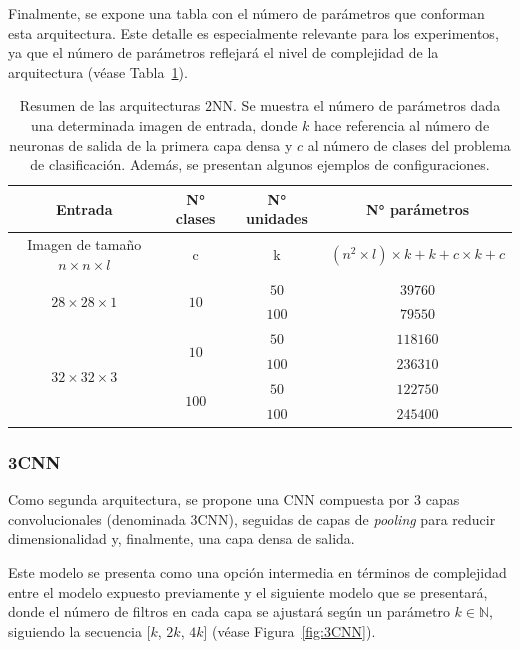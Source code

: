 Finalmente, se expone una tabla con el número de parámetros que conforman esta arquitectura. Este detalle es especialmente relevante para los experimentos, ya que el número de parámetros reflejará el nivel de complejidad de la arquitectura (véase Tabla~\ref{tab:numero-parametros}).

\begin{table}[ht]
    \centering
    \renewcommand{\arraystretch}{1.5} 
    \begin{tabular}{|c|c|c|c|}
    \hline
    \textbf{Entrada} & \textbf{N° clases} & \textbf{N° unidades} & \textbf{N° parámetros} \\ \hline
    Imagen de tamaño $n \times n \times l$ & c & k & $(n^2 \times l) \times k + k + c \times k + c$ \\ \hline
    \multirow{2}{*}{$28 \times 28 \times 1$} & \multirow{2}{*}{$10$} & $50$ & $39 760$ \\ \cline{3-4}
    & & $100$ & $79 550$ \\ \hline
    \multirow{4}{*}{$32 \times 32 \times 3$} & \multirow{2}{*}{$10$} & $50$ & $118 160$ \\ \cline{3-4}
    & & $100$ & $236 310$ \\ \cline{2-4}
    & \multirow{2}{*}{$100$} & $50$ & $122 750$ \\ \cline{3-4}
    & & $100$ & $245 400$ \\ \hline
    \end{tabular}
    \caption[Resumen de las arquitecturas $2$NN.]{Resumen de las arquitecturas $2$NN. Se muestra el número de parámetros dada una determinada imagen de entrada, donde $k$ hace referencia al número de neuronas de salida de la primera capa densa y $c$ al número de clases del problema de clasificación. Además, se presentan algunos ejemplos de configuraciones.}\label{tab:numero-parametros}
\end{table}

\subsubsection{3CNN}\label{subsubsec:3CNN}

Como segunda arquitectura, se propone una CNN compuesta por $3$ capas convolucionales (denominada $3$CNN), seguidas de capas de \textit{pooling} para reducir dimensionalidad y, finalmente, una capa densa de salida.

Este modelo se presenta como una opción intermedia en términos de complejidad entre el modelo expuesto previamente y el siguiente modelo que se presentará, donde el número de filtros en cada capa se ajustará según un parámetro $k \in \mathbb{N}$, siguiendo la secuencia [$k$, $2k$, $4k$] (véase Figura~\ref{fig:3CNN}).

